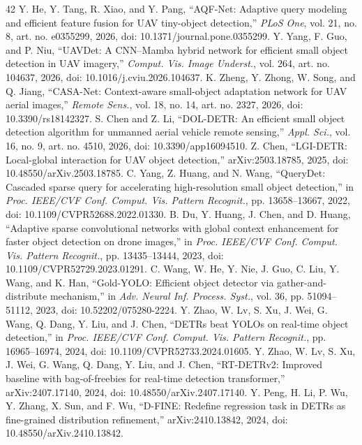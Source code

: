 \documentclass[journal]{IEEEtran}
\begin{document}
\begin{thebibliography}{42}
 Y. He, Y. Tang, R. Xiao, and Y. Pang, ``AQF-Net: Adaptive query modeling and efficient feature fusion for UAV tiny-object detection,'' \emph{PLoS One}, vol. 21, no. 8, art. no. e0355299, 2026, doi: 10.1371/journal.pone.0355299.
 Y. Yang, F. Guo, and P. Niu, ``UAVDet: A CNN--Mamba hybrid network for efficient small object detection in UAV imagery,'' \emph{Comput. Vis. Image Underst.}, vol. 264, art. no. 104637, 2026, doi: 10.1016/j.cviu.2026.104637.
 K. Zheng, Y. Zhong, W. Song, and Q. Jiang, ``CASA-Net: Context-aware small-object adaptation network for UAV aerial images,'' \emph{Remote Sens.}, vol. 18, no. 14, art. no. 2327, 2026, doi: 10.3390/rs18142327.
 S. Chen and Z. Li, ``DOL-DETR: An efficient small object detection algorithm for unmanned aerial vehicle remote sensing,'' \emph{Appl. Sci.}, vol. 16, no. 9, art. no. 4510, 2026, doi: 10.3390/app16094510.
 Z. Chen, ``LGI-DETR: Local-global interaction for UAV object detection,'' arXiv:2503.18785, 2025, doi: 10.48550/arXiv.2503.18785.
 C. Yang, Z. Huang, and N. Wang, ``QueryDet: Cascaded sparse query for accelerating high-resolution small object detection,'' in \emph{Proc. IEEE/CVF Conf. Comput. Vis. Pattern Recognit.}, pp. 13658--13667, 2022, doi: 10.1109/CVPR52688.2022.01330.
 B. Du, Y. Huang, J. Chen, and D. Huang, ``Adaptive sparse convolutional networks with global context enhancement for faster object detection on drone images,'' in \emph{Proc. IEEE/CVF Conf. Comput. Vis. Pattern Recognit.}, pp. 13435--13444, 2023, doi: 10.1109/CVPR52729.2023.01291.
 C. Wang, W. He, Y. Nie, J. Guo, C. Liu, Y. Wang, and K. Han, ``Gold-YOLO: Efficient object detector via gather-and-distribute mechanism,'' in \emph{Adv. Neural Inf. Process. Syst.}, vol. 36, pp. 51094--51112, 2023, doi: 10.52202/075280-2224.
 Y. Zhao, W. Lv, S. Xu, J. Wei, G. Wang, Q. Dang, Y. Liu, and J. Chen, ``DETRs beat YOLOs on real-time object detection,'' in \emph{Proc. IEEE/CVF Conf. Comput. Vis. Pattern Recognit.}, pp. 16965--16974, 2024, doi: 10.1109/CVPR52733.2024.01605.
 Y. Zhao, W. Lv, S. Xu, J. Wei, G. Wang, Q. Dang, Y. Liu, and J. Chen, ``RT-DETRv2: Improved baseline with bag-of-freebies for real-time detection transformer,'' arXiv:2407.17140, 2024, doi: 10.48550/arXiv.2407.17140.
 Y. Peng, H. Li, P. Wu, Y. Zhang, X. Sun, and F. Wu, ``D-FINE: Redefine regression task in DETRs as fine-grained distribution refinement,'' arXiv:2410.13842, 2024, doi: 10.48550/arXiv.2410.13842.

\end{thebibliography}
\end{document}
